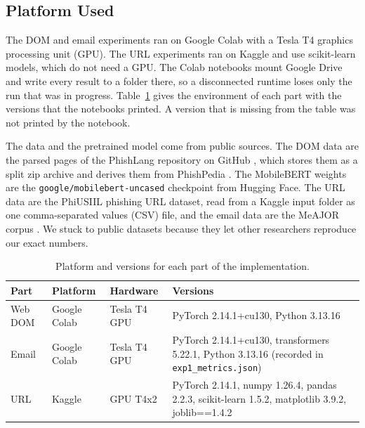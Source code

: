 \documentclass{FastFyp}
\begin{document}
\subsection{Platform Used}
\label{sec:impl-platform}
The DOM and email experiments ran on Google Colab with a Tesla T4 graphics processing unit (GPU). The URL experiments ran on Kaggle and use scikit-learn models, which do not need a GPU. The Colab notebooks mount Google Drive and write every result to a folder there, so a disconnected runtime loses only the run that was in progress. Table~\ref{tab:platform} gives the environment of each part with the versions that the notebooks printed. A version that is missing from the table was not printed by the notebook.

The data and the pretrained model come from public sources. The DOM data are the parsed pages of the PhishLang repository on GitHub \cite{phishlang2026}, which stores them as a split zip archive and derives them from PhishPedia \cite{phishpedia2021}. The MobileBERT weights are the \texttt{google/\allowbreak mobilebert-uncased} checkpoint from Hugging Face. The URL data are the PhiUSIIL phishing URL dataset, read from a Kaggle input folder as one comma-separated values (CSV) file, and the email data are the MeAJOR corpus \cite{meajor2025}. We stuck to public datasets because they let other researchers reproduce our exact numbers.

\begin{table}[H]
	\centering
	\caption{Platform and versions for each part of the implementation.}
	\label{tab:platform}
	\small
	\begin{tabularx}{\textwidth}{|>{\raggedright\arraybackslash}p{2.2cm}|>{\raggedright\arraybackslash}p{2.6cm}|>{\raggedright\arraybackslash}p{2.6cm}|>{\raggedright\arraybackslash}X|}
		\hline
		\textbf{Part} & \textbf{Platform} & \textbf{Hardware} & \textbf{Versions} \\
		\hline
		Web DOM & Google Colab & Tesla T4 GPU & PyTorch 2.14.1+cu130, Python 3.13.16  \\
		\hline
		Email & Google Colab & Tesla T4 GPU & PyTorch 2.14.1+cu130, transformers 5.22.1, Python 3.13.16 (recorded in \texttt{exp1\_metrics.json}) \\
		\hline
		URL & Kaggle & GPU T4x2 & PyTorch 2.14.1, numpy 1.26.4, pandas 2.2.3, scikit-learn 1.5.2, matplotlib 3.9.2, joblib==1.4.2 \\
		\hline
	\end{tabularx}
\end{table}
\end{document}
